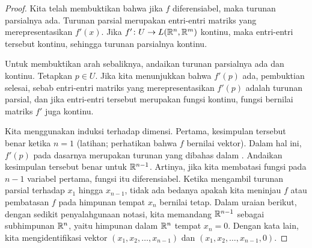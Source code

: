 \begin{proof}
Kita telah membuktikan bahwa jika $f$ diferensiabel, maka
turunan parsialnya ada.  Turunan parsial
merupakan entri-entri matriks yang merepresentasikan $f'(x)$.  Jika
$f' \colon U \to L({\mathbb{R}}^n,{\mathbb{R}}^m)$ kontinu, maka entri-entri tersebut
kontinu, sehingga turunan parsialnya kontinu.

Untuk membuktikan arah sebaliknya,
andaikan turunan parsialnya ada dan kontinu.
Tetapkan $p \in U$.  Jika kita menunjukkan bahwa $f'(p)$ ada, pembuktian selesai, sebab
entri-entri matriks yang merepresentasikan $f'(p)$ adalah turunan
parsial, dan jika entri-entri tersebut merupakan fungsi kontinu,
fungsi bernilai matriks $f'$ juga kontinu.

Kita menggunakan induksi terhadap dimensi.  Pertama,
kesimpulan tersebut benar ketika $n=1$
(latihan; perhatikan bahwa $f$ bernilai vektor).
Dalam hal ini, $f'(p)$ pada dasarnya merupakan turunan yang dibahas dalam
.
Andaikan kesimpulan tersebut benar untuk ${\mathbb{R}}^{n-1}$.
Artinya,
jika kita membatasi fungsi pada $n-1$ variabel pertama, fungsi itu diferensiabel.
Ketika mengambil turunan parsial terhadap $x_1$ hingga $x_{n-1}$,
tidak ada bedanya apakah kita meninjau $f$ atau pembatasan $f$ pada himpunan tempat
$x_n$ bernilai tetap.
Dalam uraian berikut, dengan sedikit penyalahgunaan notasi,
kita memandang ${\mathbb{R}}^{n-1}$ sebagai subhimpunan ${\mathbb{R}}^n$, yaitu himpunan dalam ${\mathbb{R}}^n$ tempat $x_n = 0$.
Dengan kata lain, kita mengidentifikasi vektor $(x_1,x_2,\ldots,x_{n-1})$ dan
$(x_1,x_2,\ldots,x_{n-1},0)$.


\end{proof}
